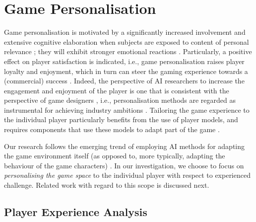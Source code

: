 \documentclass[letterpaper]{article}
\begin{document}
\section{Game Personalisation}\label{sec:gamepersonalisation}

Game personalisation is motivated by a significantly increased involvement and extensive cognitive elaboration when subjects are exposed to content of personal relevance \cite{petty1979issue}; they will exhibit stronger emotional reactions \cite{darley1992effect}. Particularly, a positive effect on player satisfaction is indicated, i.e., game personalisation raises player loyalty and enjoyment, which in turn can steer the gaming experience towards a (commercial) success \cite{teng2010customization}. Indeed, the perspective of AI researchers to increase the engagement and enjoyment of the player is one that is consistent with the perspective of game designers \cite{riedl2010scalable}, i.e., personalisation methods are regarded as instrumental for achieving industry ambitions \cite{Molyneux:2006}. Tailoring the game experience to the individual player particularly benefits from the use of player models, and requires components that use these models to adapt part of the game \cite{bakkes2012personalised-journal}.

Our research follows the emerging trend of employing AI methods for adapting the game environment itself (as opposed to, more typically, adapting the behaviour of the game characters) \cite{Bakkes:ChallengeBalancing}. In our investigation, we choose to focus on \emph{personalising the game space} to the individual player with respect to experienced challenge. Related work with regard to this scope is discussed next.


\subsection{Player Experience Analysis}
\end{document}
